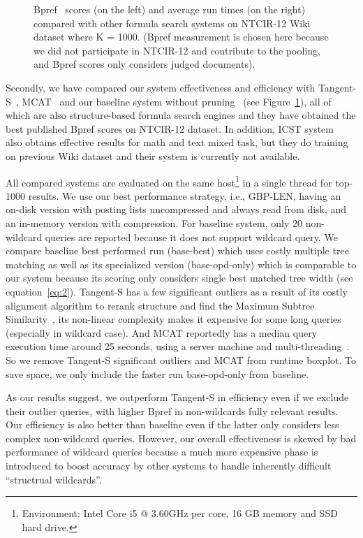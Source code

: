 \documentclass[runningheads]{llncs}
\begin{document}
\begin{figure}[!t]
\begin{center}
\caption{Bpref~\cite{buckley2004retrieval} scores (on the left) and average run times (on the right) compared with other formula search systems on NTCIR-12 Wiki dataset where K = 1000.
(Bpref measurement is chosen here because we did not participate in NTCIR-12 and contribute to the pooling, and Bpref scores only considers judged documents).
}
\label{boxplot}
\end{center}

\end{figure}

Secondly, we have compared our system effectiveness and efficiency with Tangent-S~\cite{tangent-combine2017}, MCAT~\cite{mcat_16} and our baseline system without pruning~\cite{a0_2019} (see Figure~\ref{boxplot}), all of which are also structure-based formula search engines and they have obtained the best published Bpref scores on NTCIR-12 dataset.
In addition, ICST system~\cite{peking2016} also obtains effective results for math and text mixed task, but they do training on previous Wiki dataset and their system is currently not available.

All compared systems are evaluated on the same host\footnote{Environment: Intel Core i5 @ 3.60GHz per core, 16 GB memory and SSD hard drive.} in a single thread for top-1000 results.
%
We use our best performance strategy, i.e., GBP-LEN, having an on-disk version with posting lists uncompressed and always read from disk, and an in-memory version with compression.
%
For baseline system, only 20 non-wildcard queries are reported because it does not support wildcard query.
We compare baseline best performed run (base-best) which uses costly multiple tree matching as well as its specialized version (base-opd-only) which is comparable to our system because its scoring only considers single best matched tree width (see equation~\ref{eq:2}).
%
Tangent-S has a few significant outliers as a result of its costly alignment algorithm to rerank structure and find the Maximum Subtree Similarity~\cite{tangent-multistage2016}, its non-linear complexity makes it expensive for some long queries (especially in wildcard case).
%
And MCAT reportedly has a median query execution time around 25 seconds, using a server machine and multi-threading~\cite{mcat_16}.
So we remove Tangent-S significant outliers and MCAT from runtime boxplot.
To save space, we only include the faster run base-opd-only from baseline.

As our results suggest, we outperform Tangent-S in efficiency even if we exclude their outlier queries, with higher Bpref in non-wildcards fully relevant results. Our efficiency is also better than baseline even if the latter only considers less complex non-wildcard queries.
%
However, our overall effectiveness is skewed by bad performance of wildcard queries because a much more expensive phase is introduced to boost accuracy by other systems to handle inherently difficult ``structrual wildcards''.
\end{document}
